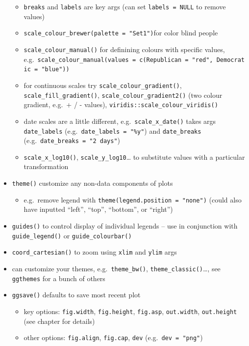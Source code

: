\documentclass[]{book}
\providecommand{\tightlist}{%
  \setlength{\itemsep}{0pt}\setlength{\parskip}{0pt}}
\theoremstyle{definition}
\theoremstyle{definition}
\theoremstyle{definition}
\theoremstyle{remark}
\begin{document}
\begin{itemize}
  \begin{itemize}
  \tightlist
  \item
    \texttt{breaks} and \texttt{labels} are key args (can set
    \texttt{labels\ =\ NULL} to remove values)
  \item
    \texttt{scale\_colour\_brewer(palette\ =\ "Set1")}for color blind
    people
  \item
    \texttt{scale\_colour\_manual()} for definining colours with
    specific values,
    e.g.~\texttt{scale\_colour\_manual(values\ =\ c(Republican\ =\ "red",\ Democratic\ =\ "blue"))}
  \item
    for continuous scales try \texttt{scale\_colour\_gradient()},
    \texttt{scale\_fill\_gradient()},
    \texttt{scale\_colour\_gradient2()} (two colour gradient, e.g.~+ / -
    values), \texttt{viridis::scale\_colour\_viridis()}
  \item
    date scales are a little different, e.g.~\texttt{scale\_x\_date()}
    takes args \texttt{date\_labels}
    (e.g.~\texttt{date\_labels\ =\ "\textquotesingle{}\%y"}) and
    \texttt{date\_breaks} (e.g.~\texttt{date\_breaks\ =\ "2\ days"})
  \item
    \texttt{scale\_x\_log10()}, \texttt{scale\_y\_log10}\ldots{} to
    substitute values with a particular transformation
  \end{itemize}
\item
  \texttt{theme()} customize any non-data components of plots

  \begin{itemize}
  \tightlist
  \item
    e.g.~remove legend with \texttt{theme(legend.position\ =\ "none")}
    (could also have inputted ``left'', ``top'', ``bottom'', or
    ``right'')
  \end{itemize}
\item
  \texttt{guides()} to control display of individual legends -- use in
  conjunction with \texttt{guide\_legend()} or
  \texttt{guide\_colourbar()}
\item
  \texttt{coord\_cartesian()} to zoom using \texttt{xlim} and
  \texttt{ylim} args
\item
  can customize your themes, e.g.~\texttt{theme\_bw()},
  \texttt{theme\_classic()}\ldots{}, see \texttt{ggthemes} for a bunch
  of others
\item
  \texttt{ggsave()} defaults to save most recent plot

  \begin{itemize}
  \tightlist
  \item
    key options: \texttt{fig.width}, \texttt{fig.height},
    \texttt{fig.asp}, \texttt{out.width}, \texttt{out.height} (see
    chapter for details)
  \item
    other options: \texttt{fig.align}, \texttt{fig.cap}, \texttt{dev}
    (e.g.~\texttt{dev\ =\ "png"})
  \end{itemize}
\end{itemize}
\end{document}
